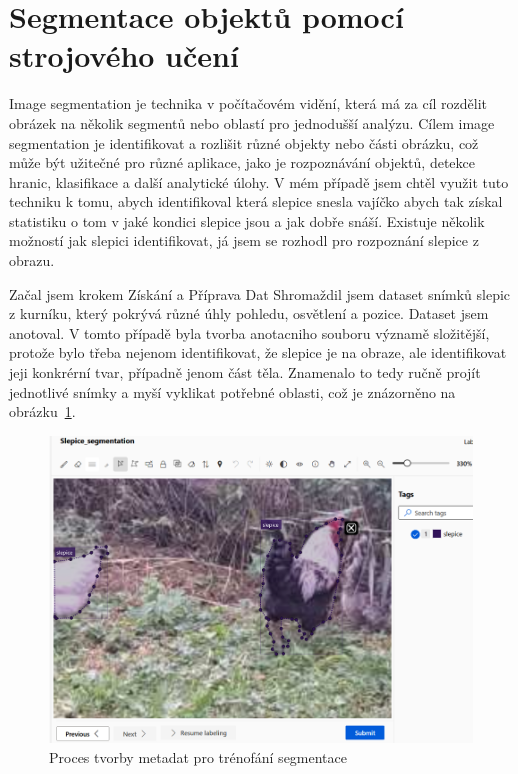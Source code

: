 \section{Segmentace objektů pomocí strojového učení}\label{sec:klasifikace-a-segmentace-objektu-pomoci-strojoveho-uceni}

Image segmentation je technika v počítačovém vidění, která má za cíl rozdělit obrázek na několik segmentů nebo oblastí pro jednodušší analýzu.
Cílem image segmentation je identifikovat a rozlišit různé objekty nebo části obrázku, což může být užitečné pro různé aplikace, jako je rozpoznávání objektů, detekce hranic, klasifikace a další analytické úlohy.
V mém případě jsem chtěl využit tuto techniku k tomu, abych identifikoval která slepice snesla vajíčko abych tak získal statistiku o tom v jaké kondici slepice jsou a jak dobře snáší.
Existuje několik možností jak slepici identifikovat, já jsem se rozhodl pro rozpoznání slepice z obrazu.

Začal jsem krokem  Získání a Příprava Dat
Shromaždil jsem dataset snímků slepic z kurníku, který pokrývá různé úhly pohledu, osvětlení a pozice.
Dataset jsem anotoval.
V tomto případě byla tvorba anotacniho souboru významě složitější, protože bylo třeba nejenom identifikovat, že slepice je na obraze, ale identifikovat jeji konkrérní tvar, případně jenom část těla.
Znamenalo to tedy ručně projít jednotlivé snímky a myší vyklikat potřebné oblasti, což je znázorněno na obrázku~\ref{fig:label_segmentation}.

\begin{figure}[h]
    \centering
    \includegraphics[width=\textwidth]{img/label_segmentation}
    \caption{Proces tvorby metadat pro trénofání segmentace}
    \label{fig:label_segmentation}
\end{figure}

